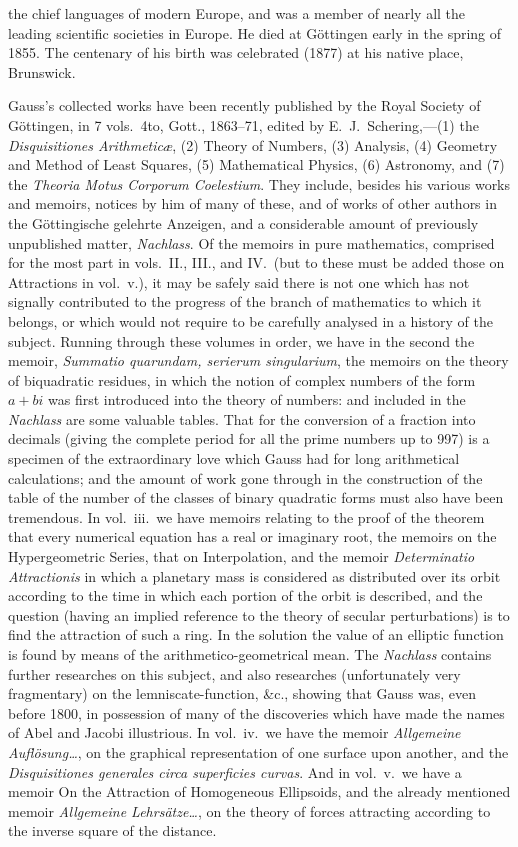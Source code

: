 \documentclass[11pt,a4paper]{book}
\begin{document}
the chief languages of modern Europe, and was a member of nearly all the leading scientific societies in Europe. He died at G\"{o}ttingen early in the spring of 1855. The centenary of his birth was celebrated (1877) at his native place, Brunswick.

Gauss's collected works have been recently published by the Royal Society of G\"{o}ttingen, in 7 vols.\ 4to, Gott., 1863--71, edited by E.\ J.\ Schering,---(1) the \textit{Disquisitiones Arithmetic\ae}, (2) Theory of Numbers, (3) Analysis, (4) Geometry and Method of Least Squares, (5) Mathematical Physics, (6) Astronomy, and (7) the \textit{Theoria Motus Corporum Coelestium}. They include, besides his various works and memoirs, notices by him of many of these, and of works of other authors in the G\"{o}ttingische gelehrte Anzeigen, and a considerable amount of previously unpublished matter, \textit{Nachlass}. Of the memoirs in pure mathematics, comprised for the most part in vols.~II., III., and IV.\ (but to these must be added those on Attractions in vol.~v.), it may be safely said there is not one which has not signally contributed to the progress of the branch of mathematics to which it belongs, or which would not require to be carefully analysed in a history of the subject. Running through these volumes in order, we have in the second the memoir, \textit{Summatio quarundam, serierum singularium}, the memoirs on the theory of biquadratic residues, in which the notion of complex numbers of the form $a + bi$ was first introduced into the theory of numbers: and included in the \textit{Nachlass} are some valuable tables. That for the conversion of a fraction into decimals (giving the complete period for all the prime numbers up to 997) is a specimen of the extraordinary love which Gauss had for long arithmetical calculations; and the amount of work gone through in the construction of the table of the number of the classes of binary quadratic forms must also have been tremendous. In vol.~iii.\ we have memoirs relating to the proof of the theorem that every numerical equation has a real or imaginary root, the memoirs on the Hypergeometric Series, that on Interpolation, and the memoir \textit{Determinatio Attractionis} in which a planetary mass is considered as distributed over its orbit according to the time in which each portion of the orbit is described, and the question (having an implied reference to the theory of secular perturbations) is to find the attraction of such a ring. In the solution the value of an elliptic function is found by means of the arithmetico-geometrical mean. The \textit{Nachlass} contains further researches on this subject, and also researches (unfortunately very fragmentary) on the lemniscate-function, \&c., showing that Gauss was, even before 1800, in possession of many of the discoveries which have made the names of Abel and Jacobi illustrious. In vol.~iv.\ we have the memoir \textit{Allgemeine Aufl\"{o}sung\ldots}, on the graphical representation of one surface upon another, and the \textit{Disquisitiones generales circa superficies curvas}. And in vol.~v.\ we have a memoir On the Attraction of Homogeneous Ellipsoids, and the already mentioned memoir \textit{Allgemeine Lehrs\"{a}tze\ldots}, on the theory of forces attracting according to the inverse square of the distance.
\end{document}
